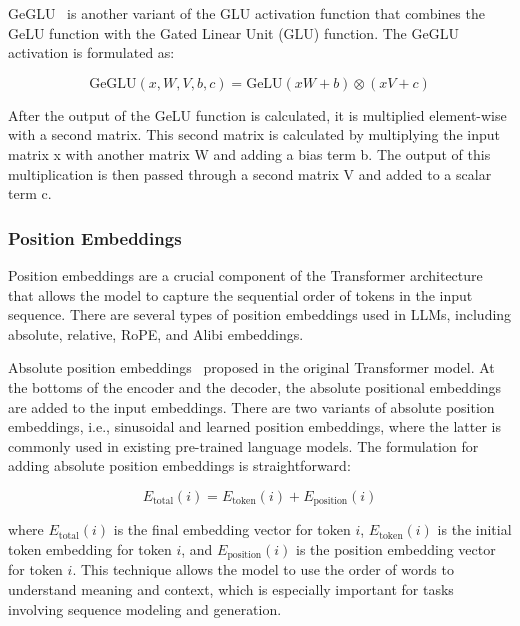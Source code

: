 GeGLU~\cite{shazeer2020glu} is another variant of the GLU activation function that combines the GeLU function with the Gated Linear Unit (GLU) function.
The GeGLU activation is formulated as:

\begin{equation}
	\text{GeGLU}\left(x, W, V, b, c\right) = \text{GeLU}\left(xW + b\right) \otimes \left(xV + c\right)
	\label{eq:geglu}
\end{equation}

\noindent After the output of the GeLU function is calculated, it is multiplied element-wise with a second matrix.
This second matrix is calculated by multiplying the input matrix x with another matrix W and adding a bias term b.
The output of this multiplication is then passed through a second matrix V and added to a scalar term c.

\subsubsection{Position Embeddings}
\label{subsubsec:position-embeddings}

Position embeddings are a crucial component of the Transformer architecture that allows the model to capture the sequential order of tokens in the input sequence.
There are several types of position embeddings used in LLMs, including absolute, relative, RoPE, and Alibi embeddings.

Absolute position embeddings~\cite{vaswani2023attention} proposed in the original Transformer model.
At the bottoms of the encoder and the decoder, the absolute positional embeddings are added to the input embeddings.
There are two variants of absolute position embeddings, i.e., sinusoidal and learned position embeddings, where the latter is commonly used in existing pre-trained language models.
The formulation for adding absolute position embeddings is straightforward:

\begin{equation}
	E_{\text{total}}(i) = E_{\text{token}}(i) + E_{\text{position}}(i)
	\label{eq:absolute-position-embeddings}
\end{equation}

\noindent where \(E_{\text{total}}(i)\) is the final embedding vector for token \(i\), \(E_{\text{token}}(i)\) is the initial token embedding for token \(i\), and \(E_{\text{position}}(i)\) is the position embedding vector for token \(i\).
This technique allows the model to use the order of words to understand meaning and context, which is especially important for tasks involving sequence modeling and generation.

